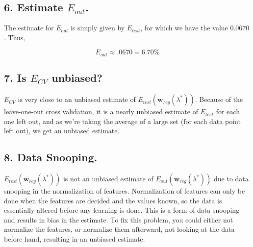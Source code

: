 \documentclass{article}
\renewcommand{\vec}[1]{\mathbf{#1}}
\begin{document}
\bigskip

\bigskip

\subsection*{6. Estimate $E_{out}$.}

The estimate for $E_{out}$ is simply given by $E_{test}$, for which we have the value $0.0670$.
Thus,

$$E_{out} \approx .0670 = 6.70\%$$

\subsection*{7. Is $E_{CV}$ unbiased?}

$E_{CV}$ is very close to an unbiased estimate of $E_{test}(\vec{w}_{reg}(\lambda^*))$. Because 
of the leave-one-out cross validation, it is a nearly unbiased estimate of $E_{test}$ for each 
one left out, and as we're taking the average of a large set (for each data point left out), we 
get an unbiased estimate.

\subsection*{8. Data Snooping.}

$E_{test}(\vec{w}_{reg}(\lambda^*))$ is not an unbiased estimate of 
$E_{out}(\vec{w}_{reg}(\lambda^*))$ due to data snooping in the normalization of features. 
Normalization of features can only be done when the features are decided and the values known, 
so the data is essentially altered before any learning is done. This is a form of data snooping
and results in bias in the estimate. To fix this problem, you could either not normalize the 
features, or normalize them afterward, not looking at the data before hand, resulting in an 
unbiased estimate.
\end{document}
